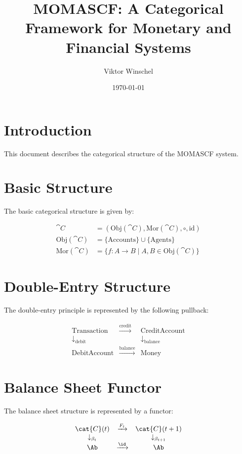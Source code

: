 \documentclass{article}
\title{MOMASCF: A Categorical Framework for Monetary and Financial Systems}
\author{Viktor Winschel}
\date{\today}
\begin{document}
\maketitle

\section{Introduction}

This document describes the categorical structure of the MOMASCF system.

\section{Basic Structure}

The basic categorical structure is given by:

\[
\begin{align*}
\cat{C} &= (\mathrm{Obj}(\cat{C}), \mathrm{Mor}(\cat{C}), \circ, \mathrm{id}) \\
\mathrm{Obj}(\cat{C}) &= \{\text{Accounts}\} \cup \{\text{Agents}\} \\
\mathrm{Mor}(\cat{C}) &= \{f: A \to B \mid A, B \in \mathrm{Obj}(\cat{C})\}
\end{align*}
\]

\section{Double-Entry Structure}

The double-entry principle is represented by the following pullback:

\[
\begin{array}{ccc}
\text{Transaction} & \xrightarrow{\text{credit}} & \text{CreditAccount} \\
\downarrow_{\text{debit}} & & \downarrow_{\text{balance}} \\
\text{DebitAccount} & \xrightarrow{\text{balance}} & \text{Money}
\end{array}
\]

\section{Balance Sheet Functor}

The balance sheet structure is represented by a functor:

\[
\begin{array}{ccc}
\cat{C}(t) & \xrightarrow{F_t} & \cat{C}(t+1) \\
\downarrow_{\beta_t} & & \downarrow_{\beta_{t+1}} \\
\Ab & \xrightarrow{\id} & \Ab
\end{array}
\]
\end{document}

